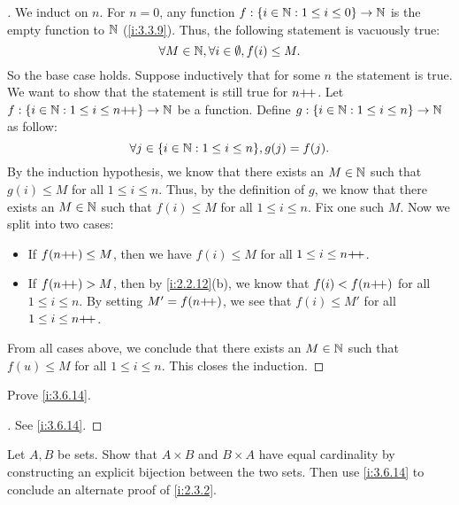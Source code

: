 \begin{proof}[]
  We induct on \(n\).
  For \(n = 0\), any function \(f : \left\lbrace i \in \mathbb{N} : 1 \leq i \leq 0\right\rbrace \to \mathbb{N}\) is the empty function to \(\mathbb{N}\) (\cref{i:3.3.9}).
  Thus, the following statement is vacuously true:
  \[
    \forall M \in \mathbb{N}, \forall i \in \emptyset, f(i) \leq M.
  \]
  So the base case holds.
  Suppose inductively that for some \(n\) the statement is true.
  We want to show that the statement is still true for \(n{+}\!{+}\).
  Let \(f : \left\lbrace i \in \mathbb{N} : 1 \leq i \leq n{+}\!{+}\right\rbrace \to \mathbb{N}\) be a function.
  Define \(g : \left\lbrace i \in \mathbb{N} : 1 \leq i \leq n\right\rbrace \to \mathbb{N}\) as follow:
  \[
    \forall j \in \set{i \in \N : 1 \leq i \leq n}, g(j) = f(j).
  \]
  By the induction hypothesis, we know that there exists an \(M \in \mathbb{N}\) such that \(g(i) \leq M\) for all \(1 \leq i \leq n\).
  Thus, by the definition of \(g\), we know that there exists an \(M \in \mathbb{N}\) such that \(f(i) \leq M\) for all \(1 \leq i \leq n\).
  Fix one such \(M\).
  Now we split into two cases:
  \begin{itemize}
    \item If \(f(n{+}\!{+}) \leq M\), then we have \(f(i) \leq M\) for all \(1 \leq i \leq n{+}\!{+}\).
    \item If \(f(n{+}\!{+}) > M\), then by \cref{i:2.2.12}(b), we know that \(f(i) < f(n{+}\!{+})\) for all \(1 \leq i \leq n\).
          By setting \(M' = f(n{+}\!{+})\), we see that \(f(i) \leq M'\) for all \(1 \leq i \leq n{+}\!{+}\).
  \end{itemize}
  From all cases above, we conclude that there exists an \(M \in \mathbb{N}\) such that \(f(u) \leq M\) for all \(1 \leq i \leq n\).
  This closes the induction.
\end{proof}

\begin{ex}\label{i:ex:3.6.4}
  Prove \cref{i:3.6.14}.
\end{ex}

\begin{proof}[]
  See \cref{i:3.6.14}.
\end{proof}

\begin{ex}\label{i:ex:3.6.5}
  Let \(A, B\) be sets.
  Show that \(A \times B\) and \(B \times A\) have equal cardinality by constructing an explicit bijection between the two sets.
  Then use \cref{i:3.6.14} to conclude an alternate proof of \cref{i:2.3.2}.
\end{ex}

